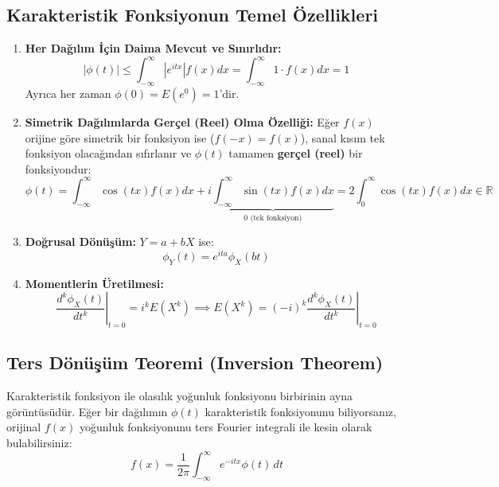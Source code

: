 \documentclass[12pt,a4paper]{article}
\begin{document}
\subsection{Karakteristik Fonksiyonun Temel Özellikleri}

\begin{enumerate}
    \item \textbf{Her Dağılım İçin Daima Mevcut ve Sınırlıdır:}
    \begin{equation}
        |\phi(t)| \le \int_{-\infty}^\infty |e^{itx}| f(x) dx = \int_{-\infty}^\infty 1 \cdot f(x) dx = 1
    \end{equation}
    Ayrıca her zaman $\phi(0) = E(e^0) = 1$'dir.

    \item \textbf{Simetrik Dağılımlarda Gerçel (Reel) Olma Özelliği:}
    Eğer $f(x)$ orijine göre simetrik bir fonksiyon ise ($f(-x) = f(x)$), sanal kısım tek fonksiyon olacağından sıfırlanır ve $\phi(t)$ tamamen \textbf{gerçel (reel)} bir fonksiyondur:
    \begin{equation}
        \phi(t) = \int_{-\infty}^{\infty} \cos(tx) f(x) dx + i \underbrace{\int_{-\infty}^{\infty} \sin(tx) f(x) dx}_{0 \text{ (tek fonksiyon)}} = 2 \int_{0}^{\infty} \cos(tx) f(x) dx \in \mathbb{R}
    \end{equation}

    \item \textbf{Doğrusal Dönüşüm:} $Y = a + bX$ ise:
    \begin{equation}
        \phi_Y(t) = e^{ita} \phi_X(bt)
    \end{equation}

    \item \textbf{Momentlerin Üretilmesi:}
    \begin{equation}
        \left. \frac{d^k \phi_X(t)}{dt^k} \right|_{t=0} = i^k E(X^k) \implies \boxed{E(X^k) = (-i)^k \left. \frac{d^k \phi_X(t)}{dt^k} \right|_{t=0}}
    \end{equation}
\end{enumerate}

\subsection{Ters Dönüşüm Teoremi (Inversion Theorem)}
Karakteristik fonksiyon ile olasılık yoğunluk fonksiyonu birbirinin ayna görüntüsüdür. Eğer bir dağılımın $\phi(t)$ karakteristik fonksiyonunu biliyorsanız, orijinal $f(x)$ yoğunluk fonksiyonunu ters Fourier integrali ile kesin olarak bulabilirsiniz:
\begin{equation}
    \boxed{f(x) = \frac{1}{2\pi} \int_{-\infty}^{\infty} e^{-itx} \phi(t) \, dt}
\end{equation}
\end{document}
